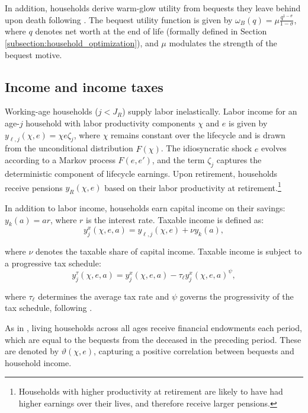 \documentclass[parskip=full]{article}
\begin{document}
In addition, households derive warm-glow utility from bequests they leave behind upon death following \citet{cagetti-denardi-2006}. The bequest utility function is given by $\omega_{B}(q)=\mu \frac{q^{1-\sigma}}{1-\sigma}$, where $q$ denotes net worth at the end of life (formally defined in Section \ref{subsection:household_optimization}), and $\mu$ modulates the strength of the bequest motive.

\subsection{Income and income taxes}\label{subsection:income}

Working-age households ($j<J_{R}$) supply labor inelastically. Labor income for an age-$j$ household with labor productivity components $\chi$ and $e$ is given by $y_{\ell,j}(\chi,e)=\chi e\zeta_j$, where $\chi$ remains constant over the lifecycle and is drawn from the unconditional distribution $\hat{F}(\chi)$. The idiosyncratic shock $e$ evolves according to a Markov process $F(e,e')$, and the term $\zeta_j$ captures the deterministic component of lifecycle earnings. Upon retirement, households receive pensions $y_{R}(\chi,e)$ based on their labor productivity at retirement.\footnote{Households with higher productivity at retirement are likely to have had higher earnings over their lives, and therefore receive larger pensions.}

In addition to labor income, households earn capital income on their savings: $y_{k}(a)=ar$, where $r$ is the interest rate. Taxable income is defined as:
\begin{equation*}\label{eq:taxable_labor_income}
  y^{x}_{j}(\chi,e,a) =y_{\ell,j}(\chi,e)+\nu y_{k}(a),
\end{equation*}

\noindent where $\nu$ denotes the taxable share of capital income. Taxable income is subject to a progressive tax schedule:
\begin{equation}\label{eq:income_tax}
  y^{\tau}_{j}(\chi,e,a) = y^{x}_{j}(\chi,e,a)-\tau_{\ell}y^{x}_{j}(\chi,e,a)^{\psi},
\end{equation}

\noindent where $\tau_{\ell}$ determines the average tax rate and $\psi$ governs the progressivity of the tax schedule, following \citep{hsv-2020}.

As in \citet{kkk-2021}, living households across all ages receive financial endowments each period, which are equal to the bequests from the deceased in the preceding period. These are denoted by $\vartheta (\chi,e)$, capturing a positive correlation between bequests and household income.
\end{document}
